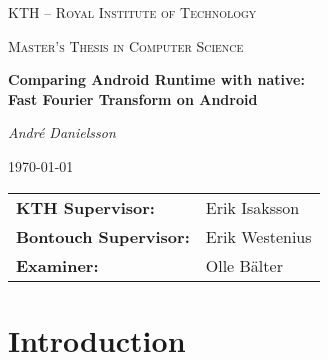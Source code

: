 \documentclass[a4paper, 12pt, notitlepage]{report}
\def\thesistitle{\LARGE Comparing Android Runtime with native:\\ Fast Fourier Transform on Android}
\def\theauthor{André Danielsson}
\def\theschool{KTH -- Royal Institute of Technology}
\def\thedegree{Master's Thesis in Computer Science}
\def\thesupervisors{%
    \begin{tabular}{ll}
        \textbf{KTH Supervisor:} & Erik Isaksson\\
        \textbf{Bontouch Supervisor:} & Erik Westenius\\
        \textbf{Examiner:} & Olle Bälter
    \end{tabular}
}
\begin{document}

\begin{titlepage}
    \centering
    {\scshape\large\theschool\par}
    \vspace{1cm}
    {\scshape\normalsize\thedegree\par}
    \vspace{1.5cm}
    {\Large\bfseries\thesistitle\par}
    \vspace{1.5cm}
    {\large\itshape\theauthor\par}
    \vspace{1cm}
    {\large \today\par}

    \vfill

    {\large\thesupervisors\par}
    \vspace{1cm}
\end{titlepage}

\begin{abstract}
    
\end{abstract}

\vspace{1cm}

\renewcommand{\abstractname}{Sammanfattning}
\begin{abstract}
    
\end{abstract}

\tableofcontents

\listoffigures

\listoftables

\chapter{Introduction}\label{ch:introduction}

\cleardoublepage
\end{document}
